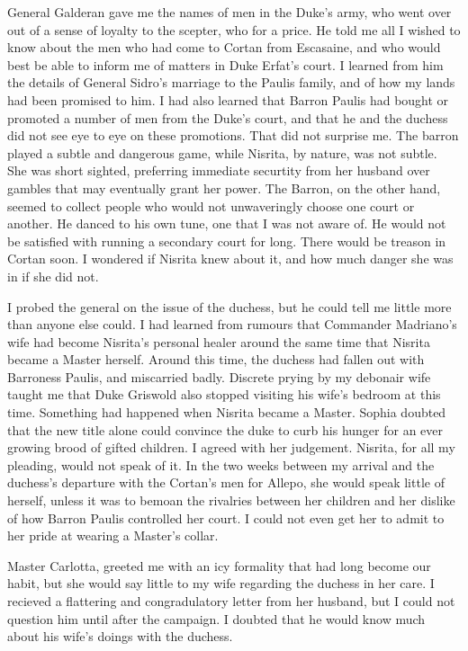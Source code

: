 \documentclass{article}
\begin{document}
General Galderan gave me the names of men in the Duke's army, who went over out of a sense of loyalty to the scepter, who for a price. He told me all I wished to know about the men who had come to Cortan from Escasaine, and who would best be able to inform me of matters in Duke Erfat's court. I learned from him the details of General Sidro's marriage to the Paulis family, and of how my lands had been promised to him. I had also learned that Barron Paulis had bought or promoted a number of men from the Duke's court, and that he and the duchess did not see eye to eye on these promotions. That did not surprise me. The barron played a subtle and dangerous game, while Nisrita, by nature, was not subtle. She was short sighted, preferring immediate securtity from her husband over gambles that may eventually grant her power. The Barron, on the other hand, seemed to collect people who would not unwaveringly choose one court or another. He danced to his own tune, one that I was not aware of. He would not be satisfied with running a secondary court for long. There would be treason in Cortan soon. I wondered if Nisrita knew about it, and how much danger she was in if she did not.

I probed the general on the issue of the duchess, but he could tell me little more than anyone else could. I had learned from rumours that Commander Madriano's wife had become Nisrita's personal healer around the same time that Nisrita became a Master herself. Around this time, the duchess had fallen out with Barroness Paulis, and miscarried badly. Discrete prying by my debonair wife taught me that Duke Griswold also stopped visiting his wife's bedroom at this time. Something had happened when Nisrita became a Master. Sophia doubted that the new title alone could convince the duke to curb his hunger for an ever growing brood of gifted children. I agreed with her judgement. Nisrita, for all my pleading, would not speak of it. In the two weeks between my arrival and the duchess's departure with the Cortan's men for Allepo, she would speak little of herself, unless it was to bemoan the rivalries between her children and her dislike of how Barron Paulis controlled her court. I could not even get her to admit to her pride at wearing a Master's collar. 

Master Carlotta, greeted me with an icy formality that had long become our habit, but she would say little to my wife regarding the duchess in her care. I recieved a flattering and congradulatory letter from her husband, but I could not question him until after the campaign. I doubted that he would know much about his wife's doings with the duchess.
\end{document}
